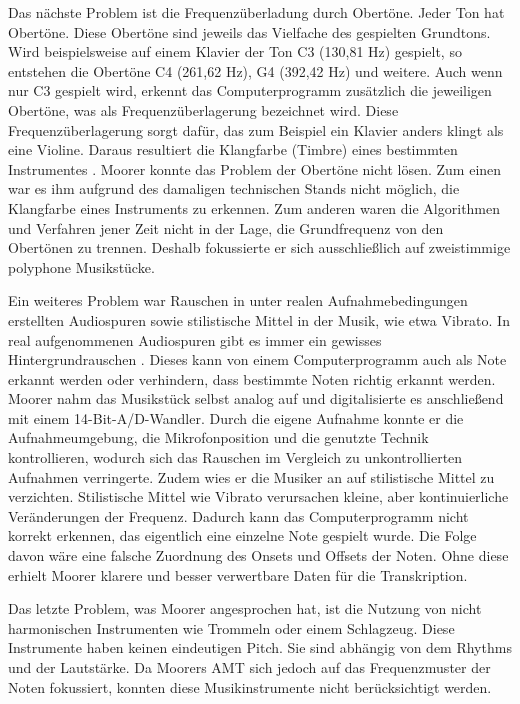 Das nächste Problem ist die Frequenzüberladung durch Obertöne.
Jeder Ton hat Obertöne.
Diese Obertöne sind jeweils das Vielfache des gespielten Grundtons.
Wird beispielsweise auf einem Klavier der Ton C3 (130,81 Hz) gespielt,
so entstehen die Obertöne C4 (261,62 Hz), G4 (392,42 Hz) und weitere.
Auch wenn nur C3 gespielt wird, erkennt das Computerprogramm zusätzlich die jeweiligen Obertöne,
was als Frequenzüberlagerung bezeichnet wird.
Diese Frequenzüberlagerung sorgt dafür, das zum Beispiel ein Klavier anders klingt als eine Violine.
Daraus resultiert die Klangfarbe (Timbre) eines bestimmten Instrumentes \cite{goswami2013timbre}.
Moorer konnte das Problem der Obertöne nicht lösen.
Zum einen war es ihm aufgrund des damaligen technischen Stands nicht möglich, die Klangfarbe eines Instruments zu erkennen.
Zum anderen waren die Algorithmen und Verfahren jener Zeit nicht in der Lage, die Grundfrequenz von den Obertönen zu trennen.
Deshalb fokussierte er sich ausschließlich auf zweistimmige polyphone Musikstücke.

Ein weiteres Problem war Rauschen in unter realen Aufnahmebedingungen erstellten Audiospuren
sowie stilistische Mittel in der Musik, wie etwa Vibrato.
In real aufgenommenen Audiospuren gibt es immer ein gewisses Hintergrundrauschen \cite{iZotope2025noisefloor}.
Dieses kann von einem Computerprogramm auch als Note erkannt werden oder verhindern,
dass bestimmte Noten richtig erkannt werden.
Moorer nahm das Musikstück selbst analog auf und digitalisierte es anschließend mit einem 14-Bit-A/D-Wandler.
Durch die eigene Aufnahme konnte er die Aufnahmeumgebung, die Mikrofonposition
und die genutzte Technik kontrollieren, wodurch sich das Rauschen im Vergleich zu unkontrollierten Aufnahmen verringerte.
Zudem wies er die Musiker an auf stilistische Mittel zu verzichten.
Stilistische Mittel wie Vibrato verursachen kleine, aber kontinuierliche Veränderungen der Frequenz.
Dadurch kann das Computerprogramm nicht korrekt erkennen, das eigentlich eine einzelne Note gespielt wurde.
Die Folge davon wäre eine falsche Zuordnung des Onsets und Offsets der Noten.
Ohne diese erhielt Moorer klarere und besser verwertbare Daten für die Transkription.

Das letzte Problem, was Moorer angesprochen hat, ist die Nutzung von nicht
harmonischen Instrumenten wie Trommeln oder einem Schlagzeug.
Diese Instrumente haben keinen eindeutigen Pitch.
Sie sind abhängig von dem Rhythms und der Lautstärke.
Da Moorers AMT sich jedoch auf das Frequenzmuster der Noten fokussiert,
konnten diese Musikinstrumente nicht berücksichtigt werden.

